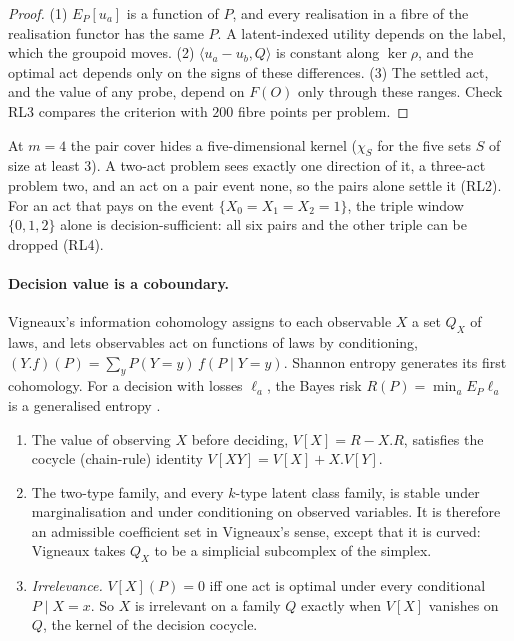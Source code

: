\begin{proof}
(1) $E_P[u_a]$ is a function of $P$, and every realisation in a fibre of the realisation functor has the same $P$. A latent-indexed
utility depends on the label, which the groupoid moves. (2) $\langle u_a-u_b,Q\rangle$ is constant along $\ker\rho$, and the optimal act
depends only on the signs of these differences. (3) The settled act, and the value of any probe, depend on $F(O)$ only through these
ranges. Check RL3 compares the criterion with $200$ fibre points per problem.
\end{proof}

At $m=4$ the pair cover hides a five-dimensional kernel ($\chi_S$ for the five sets $S$ of size at least $3$). A two-act problem sees
exactly one direction of it, a three-act problem two, and an act on a pair event none, so the pairs alone settle it (RL2). For an act that
pays on the event $\{X_0=X_1=X_2=1\}$, the triple window $\{0,1,2\}$ alone is decision-sufficient: all six pairs and the other triple can be
dropped (RL4).

\paragraph{Decision value is a coboundary.} Vigneaux's information cohomology \cite{Vigneaux2020} assigns to each observable $X$ a set
$Q_X$ of laws, and lets observables act on functions of laws by conditioning, $(Y.f)(P)=\sum_yP(Y{=}y)\,f(P\mid Y{=}y)$. Shannon entropy
generates its first cohomology. For a decision with losses $\ell_a$, the Bayes risk $R(P)=\min_aE_P\ell_a$ is a generalised entropy
\cite{DeGroot1962,GrunwaldDawid2004}.

\begin{proposition}\label{prop:vigneaux}
\begin{enumerate}
\item[(1)] The value of observing $X$ before deciding, $V[X]=R-X.R$, satisfies the cocycle (chain-rule) identity
  $V[XY]=V[X]+X.V[Y]$.
\item[(2)] The two-type family, and every $k$-type latent class family, is stable under marginalisation and under conditioning on
  observed variables. It is therefore an admissible coefficient set in Vigneaux's sense, except that it is curved: Vigneaux takes
  $Q_X$ to be a simplicial subcomplex of the simplex.
\item[(3)] \emph{Irrelevance.} $V[X](P)=0$ iff one act is optimal under every conditional $P\mid X{=}x$. So $X$ is irrelevant on a family $Q$
  exactly when $V[X]$ vanishes on $Q$, the kernel of the decision cocycle.
\end{enumerate}
\end{proposition}

